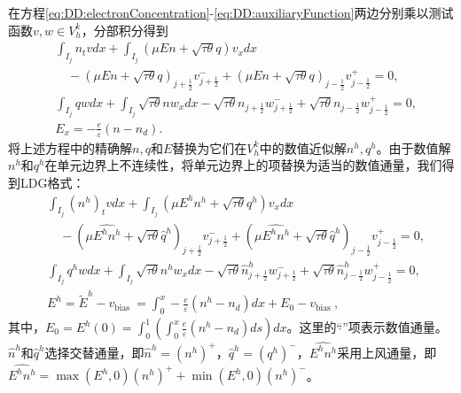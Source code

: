 在方程\eqref{eq:DD:electronConcentration}-\eqref{eq:DD:auxiliaryFunction}两边分别乘以测试函数$v,w\in V_h^k$，分部积分得到
\begin{align}
     & \int_{I_{j}} n_{t} v d x+\int_{I_{j}}(\mu E n+\sqrt{\tau \theta} q) v_{x} d x                                                                               \nonumber                     \\
     & \quad-(\mu E n+\sqrt{\tau \theta} q)_{j+\frac{1}{2}} v_{j+\frac{1}{2}}^{-}+(\mu E n+\sqrt{\tau \theta} q)_{j-\frac{1}{2}} v_{j-\frac{1}{2}}^{+}=0,                                        \\
     & \int_{I_{j}} q w d x+\int_{I_{j}} \sqrt{\tau \theta} n w_{x} d x-\sqrt{\tau \theta} n_{j+\frac{1}{2}} w_{j+\frac{1}{2}}^{-}+\sqrt{\tau \theta} n_{j-\frac{1}{2}} w_{j-\frac{1}{2}}^{+}=0, \\
     & E_{x}=-\frac{e}{\varepsilon}\left(n-n_{d}\right) .
\end{align}
将上述方程中的精确解$n, q$和$E$替换为它们在$V_{h}^{k}$中的数值近似解$n^{h}, q^{h}$。由于数值解$n^{h}$和$q^{h}$在单元边界上不连续性，将单元边界上的项替换为适当的数值通量，我们得到LDG格式：
\begin{align}
     & \int_{I_{j}}\left(n^{h}\right)_{t} v d x+\int_{I_{j}}\left(\mu E^{h} n^{h}+\sqrt{\tau \theta} q^{h}\right) v_{x} d x      \nonumber                                                                                                                \\
     & \quad-\left(\mu \widehat{E^{h} n^{h}}+\sqrt{\tau \theta} \hat{q}^{h}\right)_{j+\frac{1}{2}} v_{j+\frac{1}{2}}^{-}+\left(\mu \widehat{E^{h} n^{h}}+\sqrt{\tau \theta} \hat{q}^{h}\right)_{j-\frac{1}{2}} v_{j-\frac{1}{2}}^{+}=0, \label{eq:DDLDGn} \\
     & \int_{I_{j}} q^{h} w d x+\int_{I_{j}} \sqrt{\tau \theta} n^{h} w_{x} d x-\sqrt{\tau \theta} \hat{n}_{j+\frac{1}{2}}^{h} w_{j+\frac{1}{2}}^{-}+\sqrt{\tau \theta} \hat{n}_{j-\frac{1}{2}}^{h} w_{j-\frac{1}{2}}^{+}=0,            \label{eq:DDLDGq} \\
     & E^{h}=\tilde{E}^{h}-v_{\text {bias }}=\int_{0}^{x}-\frac{e}{\varepsilon}\left(n^{h}-n_{d}\right) d x+E_{0}-v_{\text {bias }},\label{eq:DDLDGE}
\end{align}
其中，$E_{0}=E^{h}(0)=\int_{0}^{1}\left(\int_{0}^{x} \frac{e}{\varepsilon}\left(n^{h}-n_{d}\right) d s\right) d x$。这里的“$\hat{}$”项表示数值通量。$\hat{n}^{h}$和$\hat{q}^{h}$选择交替通量，即$\hat{n}^{h}=\left(n^{h}\right)^{+}$，$\hat{q}^{h}=\left(q^{h}\right)^{-}$，$\widehat{E^{h} n^{h}}$采用上风通量，即$\widehat{E^{h} n^{h}}=\max \left(E^{h}, 0\right)\left(n^{h}\right)^{+}+\min \left(E^{h}, 0\right)\left(n^{h}\right)^{-}$。

